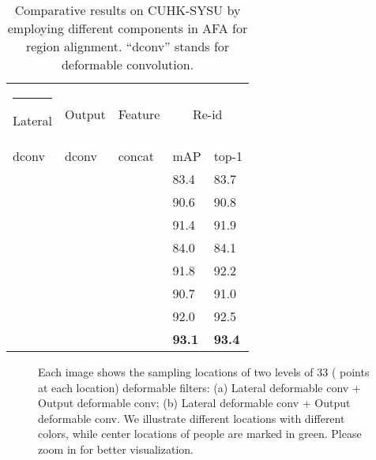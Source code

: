 \documentclass[final]{cvpr}
\makeatletter
\newcommand{\thickhline}{\noalign {\ifnum 0=`}\fi \hrule height 1pt
    \futurelet \reserved@a \@xhline
}
\makeatother
\begin{document}
\begin{table}[t]
\setlength{\abovecaptionskip}{1mm}
\centering
\begin{tabular}{p{1.2cm}<{\centering}p{1.3cm}<{\centering}p{1.2cm}<{\centering}|p{1.2cm}<{\centering}p{1.2cm}<{\centering}}
\hline\thickhline
\rowcolor{mygray}  
Lateral              & Output               & Feature              & \multicolumn{2}{c}{Re-id}                        \\ \cline{4-5} 
\rowcolor{mygray}  
dconv                 & dconv                 & concat               & mAP                  & \multicolumn{1}{c}{top-1} \\ 
\hline \hline  
 &   & & 83.4 & 83.7                         \\ 
 &   & & 90.6 & 90.8                       \\
 &   & & 91.4 & 91.9                           \\
  &   &  & 84.0 & 84.1                           \\
 &   & & 91.8 & 92.2                           \\
 &   &  & 90.7 & 91.0                            \\
 &   & & 92.0 & 92.5                            \\
 &   &  & \textbf{93.1} & \textbf{93.4}                         \\\hline
\end{tabular}
\caption{Comparative results on CUHK-SYSU by employing different components in AFA for region alignment. ``dconv'' stands for deformable convolution. }
\label{tab:region}
\end{table}

\begin{figure}[]
\setlength{\abovecaptionskip}{1mm}
\begin{center}
 \hfill
 \vspace{-4mm}
\end{center}
\vspace{-4mm}
   \caption{Each image shows the sampling locations of two levels of 33 ( points at each location) deformable filters: (a) Lateral deformable conv  + Output deformable conv; (b) Lateral deformable conv  + Output deformable conv. We illustrate different locations with different colors, while center locations of people are marked in green. Please zoom in for better visualization.}
\label{fig:dcnvis}
\end{figure}
\end{document}
